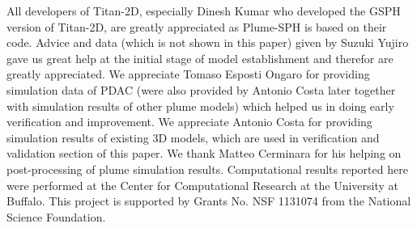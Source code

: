 \documentclass[journal abbreviation, manuscript]{copernicus}
\begin{document}
\begin{acknowledgements}
All developers of Titan-2D, especially Dinesh Kumar who developed the GSPH version of Titan-2D, are greatly appreciated as Plume-SPH is based on their code. Advice and data (which is not shown in this paper) given by Suzuki Yujiro gave us great help at the initial stage of model establishment and therefor are greatly appreciated. We appreciate Tomaso Esposti Ongaro for providing simulation data of PDAC (were also provided by Antonio Costa later together with simulation results of other plume models) which helped us in doing early verification and improvement. We appreciate Antonio Costa for providing simulation results of existing 3D models, which are used in verification and validation section of this paper. We thank Matteo Cerminara for his helping on post-processing of plume simulation results. Computational results reported here were performed at the Center for Computational Research at the University at Buffalo. This project is supported by Grants No. NSF 1131074 from the National Science Foundation.
\end{acknowledgements}


%
\end{document}
